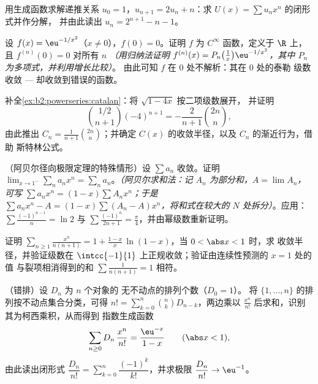 \begin{exercise}[$\star\star$]\label{exo:b2:powerseries:6}
用生成函数求解递推关系 $u_0 = 1$，$u_{n+1} =
2u_n + n$：求 $U(x) = \sum u_nx^n$ 的闭形式并作分解，
并由此读出 $u_n = 2^{n+1} - n - 1$。
\end{exercise}

\begin{exercise}[$\star\star$]\label{exo:b2:powerseries:7}
设 $f(x) = \eu^{-1/x^2}$（$x \neq 0$），$f(0) = 0$。证明
$f$ 为 $C^\infty$ 函数，定义于 $\R$ 上，且 $f^{(n)}(0) = 0$ 对所有 $n$
\emph{（用归纳法证明 $f^{(n)}(x) = P_n\bigl(\frac1x\bigr)
\eu^{-1/x^2}$，其中 $P_n$ 为多项式，并利用增长比较）}。
由此可知 $f$ 在 $0$ 处不解析：其在 $0$ 处的泰勒
级数收敛 --- 却收敛到错误的函数。
\end{exercise}

\begin{exercise}[$\star\star\star$]\label{exo:b2:powerseries:8}
补全\cref{ex:b2:powerseries:catalan}：将 $\sqrt{1 - 4x}$ 按二项级数展开，
并证明
\[
\binom{1/2}{n+1}(-4)^{n+1} = -\frac{2}{n+1}\binom{2n}{n},
\]
由此推出 $C_n = \frac{1}{n+1}\binom{2n}{n}$；并确定
$C(x)$ 的收敛半径，以及 $C_n$ 的渐近行为，借助
斯特林公式。
\end{exercise}

\begin{exercise}[$\star\star\star$]\label{exo:b2:powerseries:9}
（阿贝尔径向极限定理的特殊情形）设 $\sum a_n$
收敛。证明 $\lim_{x \to 1^-} \sum_{n} a_n x^n = \sum_n
a_n$。\emph{（阿贝尔求和法：记 $A_n$ 为部分和，$A =
\lim A_n$，可写 $\sum a_nx^n = (1 - x)\sum A_n x^n$；于是 $\sum
a_nx^n - A = (1-x)\sum (A_n - A)x^n$，将和式在较大的
$N$ 处拆分）}。应用：$\sum \frac{(-1)^{n-1}}{n} = \ln 2$ 与 $\sum
\frac{(-1)^n}{2n+1} = \frac\pi4$，并由幂级数重新证明。
\end{exercise}

\begin{exercise}[$\star$]\label{exo:b2:powerseries:10}
证明 $\displaystyle\sum_{n\geq1}\frac{x^n}{n(n+1)} = 1 +
\frac{1-x}{x}\,\ln(1-x)$，当 $0 < \abs x < 1$ 时，求
收敛半径，并验证级数在
$\intcc{-1}{1}$ 上正规收敛；验证由连续性预测的 $x = 1$ 处的值
与裂项相消得到的和 $\sum
\frac{1}{n(n+1)} = 1$ 相符。
\end{exercise}

\begin{exercise}[$\star\star$]\label{exo:b2:powerseries:11}
（错排）设 $D_n$ 为 $n$ 个对象的
无不动点的排列个数（$D_0 = 1$）。
将 $\{1, \dots, n\}$ 的排列按不动点集合分类，可得
$n! = \sum_{k=0}^{n}\binom nk D_{n-k}$，两边乘以
$\frac{x^n}{n!}$ 后求和，识别其为柯西乘积，从而得到
指数生成函数
\[
\sum_{n\geq0} D_n\,\frac{x^n}{n!} = \frac{\eu^{-x}}{1-x}
\qquad (\abs x < 1),
\]
由此读出闭形式 $\dfrac{D_n}{n!} =
\sum_{k=0}^{n}\dfrac{(-1)^k}{k!}$，并求极限 $\dfrac{D_n}{n!}
\to \eu^{-1}$。
\end{exercise}

